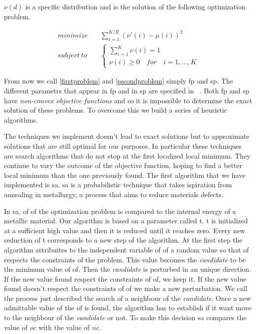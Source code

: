 \documentclass[journal]{IEEEtran}
\begin{document}
$\nu(d)$ is a specific distribution and is the solution of the following optimization problem.

\begin{equation}
	\label{secondproblem}
	\begin{split}
		minimize & \quad \sum_{i=1}^{K/R}(\nu'(i)-\mu(i))^2 \\
		subject \ to & \quad \begin{cases}
			\sum_{i=1}^K \nu(i) = 1 \\
			\nu(i) \geq 0 \quad for \quad i=1,...,K
		\end{cases}
	\end{split}
\end{equation}

From now we call \ref{firstproblem} and \ref{secondproblem} simply \gls{fp} and \gls{sp}. The different parametrs that appear in \gls{fp} and in \gls{sp} are specified in ~\cite{Lin2007}. Both \gls{fp} and \gls{sp} have \textit{non-convex objective functions} and so it is impossible to determine the exact solution of these problems. To overcome this we build a series of heuristic algorithms.

The techniques we implement doesn't lead to exact solutions but to approximate solutions that are still optimal for our purposes. In particular these techniques are search algorithms that do not stop at the first localized local minimum. They continue to vary the outcome of the objective function, hoping to find a better local minimum than the one previously found. The first algorithm that we have implemented is \gls{sa}. \gls{sa} is a probabilistic technique that takes ispiration from annealing in metallurgy, a process that aims to reduce materials defects.

In \gls{sa}, \gls{of} of the optimization problem is compared to the internal energy of a metallic material. Our algorithm is based on a parameter called \gls{t}. \gls{t} is initialized at a sufficient high value and then it is reduced until it reaches zero. Every new reduction of \gls{t} corresponds to a new step of the algorithm. At the first step the algorithm attribuites to the independent variable of \gls{of} a random value so that \gls{of} respects the constraints of the problem. This value becomes the \textit{candidate} to be the minimum value of \gls{of}. Then the \textit{candidate} is perturbed in an unique direction. If the new value found respect the constraints of \gls{of}, we keep it. If the new value found doesn't respect the constraints of \gls{of} we make a new perturbation. We call the process just described the search of a neighbour of the \textit{candidate}. Once a new admittable value of the \gls{of} is found, the algorithm has to establish if it want move to the neighbour of the \textit{candidate} or not. To make this decision \gls{sa} compares the value of \textit{oc} with the value of \textit{nc}.
\end{document}
